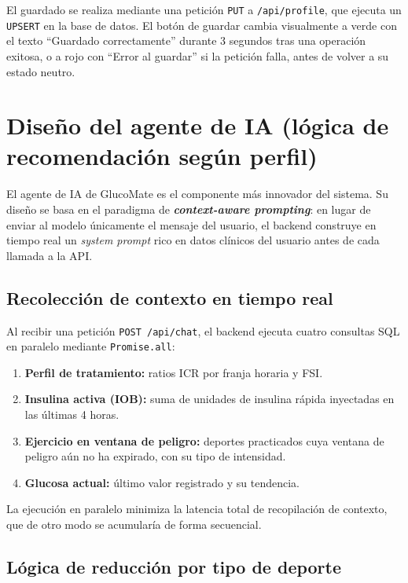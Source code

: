 El guardado se realiza mediante una petición \texttt{PUT} a \texttt{/api/profile},
que ejecuta un \texttt{UPSERT} en la base de datos. El botón de guardar cambia
visualmente a verde con el texto ``Guardado correctamente'' durante 3 segundos tras una
operación exitosa, o a rojo con ``Error al guardar'' si la petición falla, antes
de volver a su estado neutro.

\section{Diseño del agente de IA (lógica de recomendación según perfil)}
\label{sec:diseno-ia}

El agente de IA de GlucoMate es el componente más innovador del sistema. Su diseño
se basa en el paradigma de \textbf{\textit{context-aware prompting}}: en lugar de
enviar al modelo únicamente el mensaje del usuario, el backend construye en tiempo
real un \textit{system prompt} rico en datos clínicos del usuario antes de cada
llamada a la API.

\subsection{Recolección de contexto en tiempo real}
\label{subsec:contexto-ia}

Al recibir una petición \texttt{POST /api/chat}, el backend ejecuta cuatro consultas
SQL en paralelo mediante \texttt{Promise.all}:

\begin{enumerate}
    \item \textbf{Perfil de tratamiento:} ratios ICR por franja horaria y FSI.
    \item \textbf{Insulina activa (IOB):} suma de unidades de insulina rápida
          inyectadas en las últimas 4 horas.
    \item \textbf{Ejercicio en ventana de peligro:} deportes practicados cuya
          ventana de peligro aún no ha expirado, con su tipo de intensidad.
    \item \textbf{Glucosa actual:} último valor registrado y su tendencia.
\end{enumerate}

La ejecución en paralelo minimiza la latencia total de recopilación de contexto,
que de otro modo se acumularía de forma secuencial.

\subsection{Lógica de reducción por tipo de deporte}
\label{subsec:reduccion-deporte}


